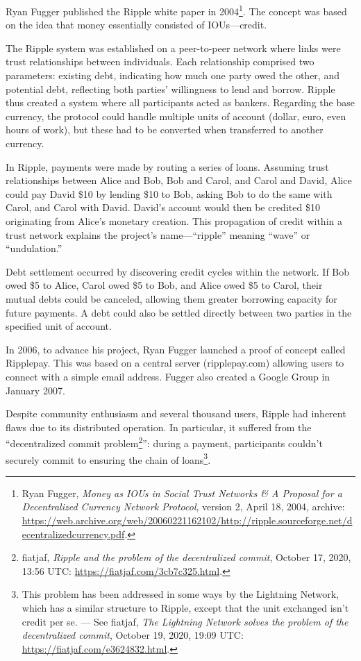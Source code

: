 \documentclass[
  a5paper,
  smalldemyvopaper,10pt,twoside,onecolumn,openright,extrafontsizes,hidelinks]{memoir}
\begin{document}
Ryan Fugger published the Ripple white paper in 2004\footnote{Ryan
  Fugger, \emph{Money as IOUs in Social Trust Networks \& A Proposal for
  a Decentralized Currency Network Protocol}, version 2, April 18, 2004,
  archive:
  \url{https://web.archive.org/web/20060221162102/http://ripple.sourceforge.net/decentralizedcurrency.pdf}.}.
The concept was based on the idea that money essentially consisted of
IOUs---credit.

The Ripple system was established on a peer-to-peer network where links
were trust relationships between individuals. Each relationship
comprised two parameters: existing debt, indicating how much one party
owed the other, and potential debt, reflecting both parties' willingness
to lend and borrow. Ripple thus created a system where all participants
acted as bankers. Regarding the base currency, the protocol could handle
multiple units of account (dollar, euro, even hours of work), but these
had to be converted when transferred to another currency.

In Ripple, payments were made by routing a series of loans. Assuming
trust relationships between Alice and Bob, Bob and Carol, and Carol and
David, Alice could pay David \$10 by lending \$10 to Bob, asking Bob to
do the same with Carol, and Carol with David. David's account would then
be credited \$10 originating from Alice's monetary creation. This
propagation of credit within a trust network explains the project's
name---``ripple'' meaning ``wave'' or ``undulation.''

Debt settlement occurred by discovering credit cycles within the
network. If Bob owed \$5 to Alice, Carol owed \$5 to Bob, and Alice owed
\$5 to Carol, their mutual debts could be canceled, allowing them
greater borrowing capacity for future payments. A debt could also be
settled directly between two parties in the specified unit of account.

In 2006, to advance his project, Ryan Fugger launched a proof of concept
called Ripplepay. This was based on a central server (ripplepay.com)
allowing users to connect with a simple email address. Fugger also
created a Google Group in January 2007.

Despite community enthusiasm and several thousand users, Ripple had
inherent flaws due to its distributed operation. In particular, it
suffered from the ``decentralized commit problem\footnote{fiatjaf,
  \emph{Ripple and the problem of the decentralized commit}, October 17,
  2020, 13:56 UTC: \url{https://fiatjaf.com/3cb7c325.html}.}'': during a
payment, participants couldn't securely commit to ensuring the chain of
loans\footnote{This problem has been addressed in some ways by the
  Lightning Network, which has a similar structure to Ripple, except
  that the unit exchanged isn't credit per se. --- See fiatjaf,
  \emph{The Lightning Network solves the problem of the decentralized
  commit}, October 19, 2020, 19:09 UTC:
  \url{https://fiatjaf.com/e3624832.html}.}.
\end{document}
